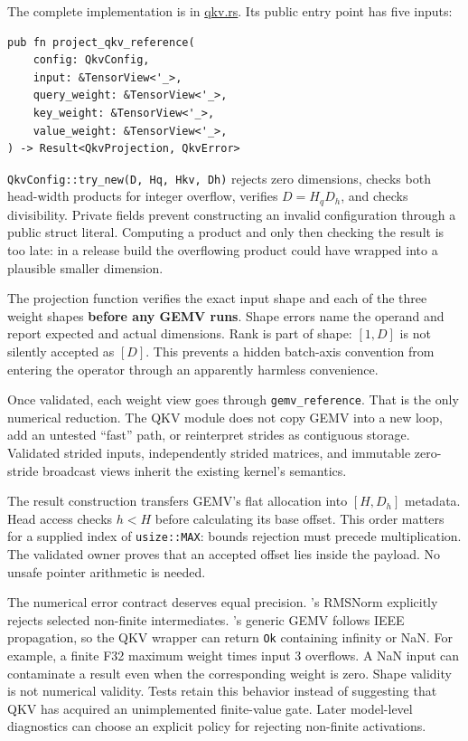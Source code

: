 The complete implementation is in
\href{https://github.com/hermonai/inside-the-llm-engine/blob/astra-visual-rewrite/code/mini-engine/crates/engine0/src/qkv.rs}{qkv.rs}.
Its public entry point has five inputs:

\begin{verbatim}
pub fn project_qkv_reference(
    config: QkvConfig,
    input: &TensorView<'_>,
    query_weight: &TensorView<'_>,
    key_weight: &TensorView<'_>,
    value_weight: &TensorView<'_>,
) -> Result<QkvProjection, QkvError>
\end{verbatim}

\texttt{QkvConfig::try\_new(D,\ Hq,\ Hkv,\ Dh)} rejects zero dimensions,
checks both head-width products for integer overflow, verifies
\(D=H_qD_h\), and checks divisibility. Private fields prevent
constructing an invalid configuration through a public struct literal.
Computing a product and only then checking the result is too late: in a
release build the overflowing product could have wrapped into a
plausible smaller dimension.

The projection function verifies the exact input shape and each of the
three weight shapes \textbf{before any GEMV runs}. Shape errors name the
operand and report expected and actual dimensions. Rank is part of
shape: \([1,D]\) is not silently accepted as \([D]\). This prevents a
hidden batch-axis convention from entering the operator through an
apparently harmless convenience.

Once validated, each weight view goes through \texttt{gemv\_reference}.
That is the only numerical reduction. The QKV module does not copy GEMV
into a new loop, add an untested ``fast'' path, or reinterpret strides
as contiguous storage. Validated strided inputs, independently strided
matrices, and immutable zero-stride broadcast views inherit the existing
kernel's semantics.

The result construction transfers GEMV's flat allocation into
\([H,D_h]\) metadata. Head access checks \(h<H\) before calculating its
base offset. This order matters for a supplied index of
\texttt{usize::MAX}: bounds rejection must precede multiplication. The
validated owner proves that an accepted offset lies inside the payload.
No unsafe pointer arithmetic is needed.

The numerical error contract deserves equal precision. 's
RMSNorm explicitly rejects selected non-finite intermediates. 's generic GEMV follows IEEE propagation, so the QKV wrapper can return
\texttt{Ok} containing infinity or NaN. For example, a finite F32
maximum weight times input 3 overflows. A NaN input can contaminate a
result even when the corresponding weight is zero. Shape validity is not
numerical validity. Tests retain this behavior instead of suggesting
that QKV has acquired an unimplemented finite-value gate. Later
model-level diagnostics can choose an explicit policy for rejecting
non-finite activations.


